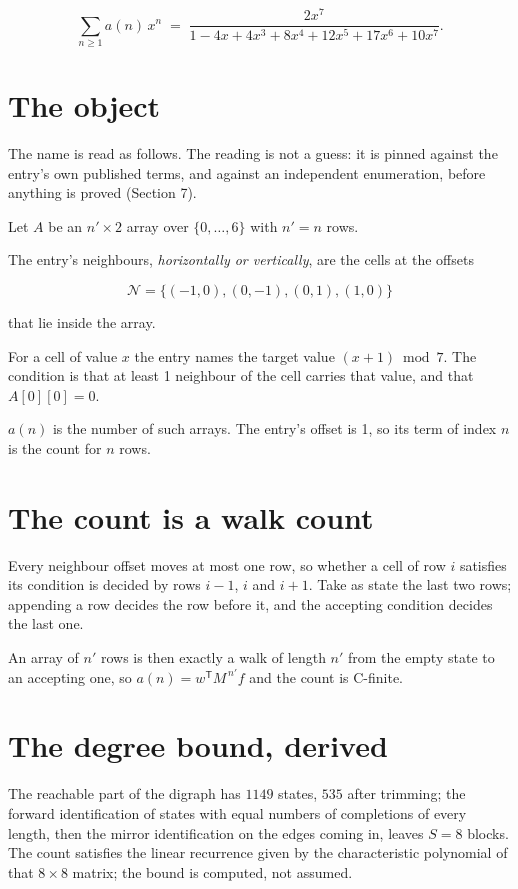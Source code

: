 \documentclass[11pt]{article}
\theoremstyle{definition}
\begin{document}
\[\sum_{n \ge 1} a(n)\,x^n \;=\; \frac{2x^{7}}{1 - 4x + 4x^{3} + 8x^{4} + 12x^{5} + 17x^{6} + 10x^{7}}.\]

\section{The object}

The name is read as follows. The reading is not a guess: it is pinned against the entry's own published terms, and against an independent enumeration, before anything is proved (Section 7).

Let $A$ be an $n' \times 2$ array over $\{0,\dots,6\}$ with $n' = n$ rows.

The entry's neighbours, {\itshape horizontally or vertically}, are the cells at the offsets

\[\mathcal{N} = \{(-1,0), (0,-1), (0,1), (1,0)\}\]

that lie inside the array.

For a cell of value $x$ the entry names the target value $(x + 1) \bmod 7$. The condition is that at least 1 neighbour of the cell carries that value, and that $A[0][0] = 0$.

$a(n)$ is the number of such arrays. The entry's offset is 1, so its term of index $n$ is the count for $n$ rows.

\section{The count is a walk count}

Every neighbour offset moves at most one row, so whether a cell of row $i$ satisfies its condition is decided by rows $i-1$, $i$ and $i+1$. Take as state the last two rows; appending a row decides the row before it, and the accepting condition decides the last one.

An array of $n'$ rows is then exactly a walk of length $n'$ from the empty state to an accepting one, so $a(n) = w^{\mathsf T}M^{\,n'}f$ and the count is C-finite.

\section{The degree bound, derived}

The reachable part of the digraph has $1149$ states, $535$ after trimming; the forward identification of states with equal numbers of completions of every length, then the mirror identification on the edges coming in, leaves $S = 8$ blocks. The count satisfies the linear recurrence given by the characteristic polynomial of that $8\times8$ matrix; the bound is computed, not assumed.
\end{document}
